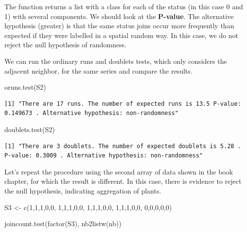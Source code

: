 \documentclass[
  letterpaper,
  DIV=11,
  numbers=noendperiod]{scrreprt}
\newenvironment{Shaded}{\begin{snugshade}}{\end{snugshade}}
\newcommand{\DecValTok}[1]{\textcolor[rgb]{0.68,0.00,0.00}{#1}}
\newcommand{\FunctionTok}[1]{\textcolor[rgb]{0.28,0.35,0.67}{#1}}
\newcommand{\NormalTok}[1]{\textcolor[rgb]{0.00,0.23,0.31}{#1}}
\newcommand{\OtherTok}[1]{\textcolor[rgb]{0.00,0.23,0.31}{#1}}
\begin{document}
The function returns a list with a class for each of the status (in this
case 0 and 1) with several components. We should look at the
\textbf{P-value}. The alternative hypothesis (greater) is that the same
status joins occur more frequently than expected if they were labelled
in a spatial random way. In this case, we do not reject the null
hypothesis of randomness.

We can run the ordinary runs and doublets tests, which only considers
the adjacent neighbor, for the same series and compare the results.

\begin{Shaded}
\begin{Highlighting}[]
\FunctionTok{oruns.test}\NormalTok{(S2)}
\end{Highlighting}
\end{Shaded}

\begin{verbatim}
[1] "There are 17 runs. The number of expected runs is 13.5 P-value: 0.149673 . Alternative hypothesis: non-randomness"
\end{verbatim}

\begin{Shaded}
\begin{Highlighting}[]
\FunctionTok{doublets.test}\NormalTok{(S2)}
\end{Highlighting}
\end{Shaded}

\begin{verbatim}
[1] "There are 3 doublets. The number of expected doublets is 5.28 . P-value: 0.3009 . Alternative hypothesis: non-randomness"
\end{verbatim}

Let's repeat the procedure using the second array of data shown in the
book chapter, for which the result is different. In this case, there is
evidence to reject the null hypothesis, indicating aggregation of
plants.

\begin{Shaded}
\begin{Highlighting}[]
\NormalTok{S3 }\OtherTok{\textless{}{-}} \FunctionTok{c}\NormalTok{(}\DecValTok{1}\NormalTok{,}\DecValTok{1}\NormalTok{,}\DecValTok{1}\NormalTok{,}\DecValTok{0}\NormalTok{,}\DecValTok{0}\NormalTok{,}
       \DecValTok{1}\NormalTok{,}\DecValTok{1}\NormalTok{,}\DecValTok{1}\NormalTok{,}\DecValTok{0}\NormalTok{,}\DecValTok{0}\NormalTok{,}
       \DecValTok{1}\NormalTok{,}\DecValTok{1}\NormalTok{,}\DecValTok{1}\NormalTok{,}\DecValTok{0}\NormalTok{,}\DecValTok{0}\NormalTok{,}
       \DecValTok{1}\NormalTok{,}\DecValTok{1}\NormalTok{,}\DecValTok{1}\NormalTok{,}\DecValTok{0}\NormalTok{,}\DecValTok{0}\NormalTok{,}
       \DecValTok{0}\NormalTok{,}\DecValTok{0}\NormalTok{,}\DecValTok{0}\NormalTok{,}\DecValTok{0}\NormalTok{,}\DecValTok{0}\NormalTok{)}

\FunctionTok{joincount.test}\NormalTok{(}\FunctionTok{factor}\NormalTok{(S3), }
                \FunctionTok{nb2listw}\NormalTok{(nb))}
\end{Highlighting}
\end{Shaded}
\end{document}
